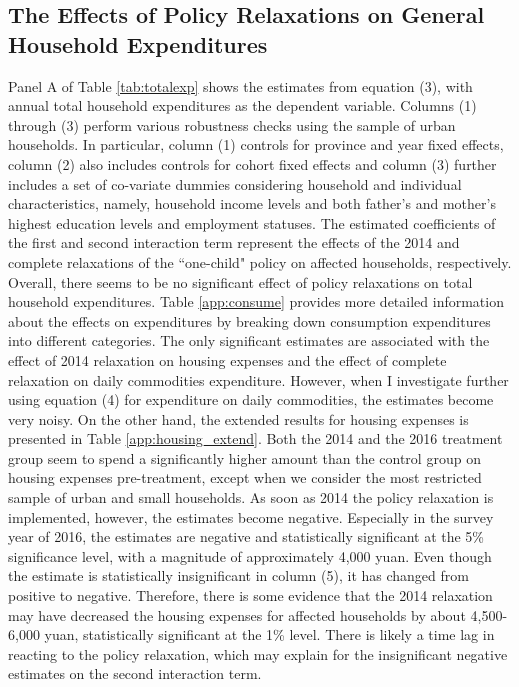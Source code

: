 \documentclass[12pt]{extarticle}
\begin{document}
\subsection{The Effects of Policy Relaxations on General Household Expenditures}
Panel A of Table \ref{tab:totalexp} shows the estimates from equation (3), with annual total household expenditures as the dependent variable. Columns (1) through (3) perform various robustness checks using the sample of urban households. In particular, column (1) controls for province and year fixed effects, column (2) also includes controls for cohort fixed effects and column (3) further includes a set of co-variate dummies considering household and individual characteristics, namely, household income levels and both father's and mother's highest education levels and employment statuses. The estimated coefficients of the first and second interaction term represent the effects of the 2014 and complete relaxations of the ``one-child" policy on affected households, respectively. \\
\indent Overall, there seems to be no significant effect of policy relaxations on total household expenditures. Table \ref{app:consume} provides more detailed information about the effects on expenditures by breaking down consumption expenditures into different categories. The only significant estimates are associated with the effect of 2014 relaxation on housing expenses and the effect of complete relaxation on daily commodities expenditure. However, when I investigate further using equation (4) for expenditure on daily commodities, the estimates become very noisy. On the other hand, the extended results for housing expenses is presented in Table \ref{app:housing_extend}. Both the 2014 and the 2016 treatment group seem to spend a significantly higher amount than the control group on housing expenses pre-treatment, except when we consider the most restricted sample of urban and small households. As soon as 2014 the policy relaxation is implemented, however, the estimates become negative. Especially in the survey year of 2016, the estimates are negative and statistically significant at the 5\% significance level, with a magnitude of approximately 4,000 yuan. Even though the estimate is statistically insignificant in column (5), it has changed from positive to negative. Therefore, there is some evidence that the 2014 relaxation may have decreased the housing expenses for affected households by about 4,500-6,000 yuan, statistically significant at the 1\% level. There is likely a time lag in reacting to the policy relaxation, which may explain for the insignificant negative estimates on the second interaction term.
\end{document}
